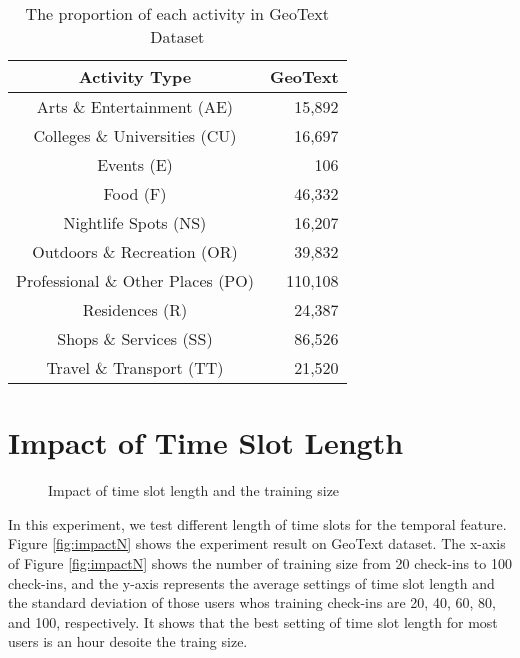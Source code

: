 \begin{table}[]
\centering
\caption{The proportion of each activity in GeoText Dataset}
\label{fig:distri_activity}
\begin{tabular}{cr}
\hline
Activity Type                     & \multicolumn{1}{c}{GeoText} \\ \hline
Arts \& Entertainment (AE)        & 15,892                      \\
Colleges \& Universities (CU)     & 16,697                      \\
Events (E)                        & 106                         \\
Food (F)                          & 46,332                      \\
Nightlife Spots (NS)              & 16,207                      \\
Outdoors \& Recreation (OR)       & 39,832                      \\
Professional \& Other Places (PO) & 110,108                     \\
Residences (R)                    & 24,387                      \\
Shops \& Services (SS)            & 86,526                      \\
Travel \& Transport (TT)          & 21,520                      \\ \hline
\end{tabular}
\end{table}


\section{Impact of Time Slot Length}
\label{sec:5-2}

\begin{figure}
\centering
{}
\caption{Impact of time slot length and the training size}
\end{figure}


In this experiment, we test different length of time slots for the temporal feature. Figure \ref{fig:impactN} shows the experiment result on GeoText dataset. The x-axis of Figure \ref{fig:impactN} shows the number of training size from 20 check-ins to 100 check-ins, and the y-axis represents the average settings of time slot length and the standard deviation of those users whos training check-ins are 20, 40, 60, 80, and 100, respectively. It shows that the best setting of time slot length for most users is an hour desoite the traing size.


